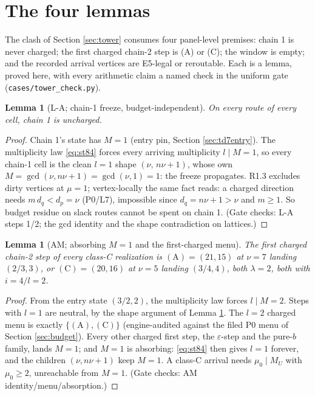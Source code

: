 \documentclass[11pt]{article}
\newtheorem{lemma}[theorem]{Lemma}
\theoremstyle{definition}
\theoremstyle{remark}
\begin{document}
\section{The four lemmas}\label{sec:lemmas}

The clash of Section \ref{sec:tower} consumes four panel-level premises: chain 1 is never charged; the first charged chain-2 step is (A) or (C); the window is empty; and the recorded arrival vertices are E5-legal or reroutable. Each is a lemma, proved here, with every arithmetic claim a named check in the uniform gate (\texttt{cases/tower\_check.py}).

\begin{lemma}[L-A; chain-1 freeze, budget-independent]\label{lem:LA}
On every route of every cell, chain 1 is uncharged.
\end{lemma}

\begin{proof}
Chain 1's state has $M=1$ (entry pin, Section \ref{sec:td7entry}). The multiplicity law \eqref{eq:st84} forces every arriving multiplicity $l\mid M=1$, so every chain-1 cell is the clean $l=1$ shape $(\nu,\,n\nu+1)$, whose own $M=\gcd(\nu,n\nu+1)=\gcd(\nu,1)=1$: the freeze propagates. R1.3 excludes dirty vertices at $\mu=1$; vertex-locally the same fact reads: a charged direction needs $m\,d_q<d_p=\nu$ (P0/L7), impossible since $d_q=n\nu+1>\nu$ and $m\geq1$. So budget residue on slack routes cannot be spent on chain 1. (Gate checks: L-A steps 1/2; the gcd identity and the shape contradiction on lattices.)
\end{proof}

\begin{lemma}[AM; absorbing $M=1$ and the first-charged menu]\label{lem:AM}
The first charged chain-2 step of every class-C realization is $(\mathrm A)=(21,15)$ at $\nu=7$ landing $(2/3,3)$, or $(\mathrm C)=(20,16)$ at $\nu=5$ landing $(3/4,4)$, both $\lambda=2$, both with $i=4/l=2$.
\end{lemma}

\begin{proof}
From the entry state $(3/2,2)$, the multiplicity law forces $l\mid M=2$. Steps with $l=1$ are neutral, by the shape argument of Lemma \ref{lem:LA}. The $l=2$ charged menu is exactly $\{(\mathrm A),(\mathrm C)\}$ (engine-audited against the filed P0 menu of Section \ref{sec:budget}). Every other charged first step, the $\varepsilon$-step and the pure-$b$ family, lands $M=1$; and $M=1$ is absorbing: \eqref{eq:st84} then gives $l=1$ forever, and the children $(\nu,n\nu+1)$ keep $M=1$. A class-C arrival needs $\mu_0\mid M_U$ with $\mu_0\geq2$, unreachable from $M=1$. (Gate checks: AM identity/menu/absorption.)
\end{proof}
\end{document}
